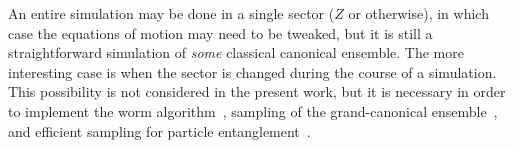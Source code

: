 An entire simulation may be done in a single sector ($Z$ or otherwise), in which case the equations of motion may need to be tweaked, but it is still a straightforward simulation of \emph{some} classical canonical ensemble.
The more interesting case is when the sector is changed during the course of a simulation.
This possibility is not considered in the present work, but it is necessary in order to implement the worm algorithm~\cite{boninsegni2006worm}, sampling of the grand-canonical ensemble~\cite{herdman2014quantum}, and efficient sampling for particle entanglement~\cite{herdman2014path}.
